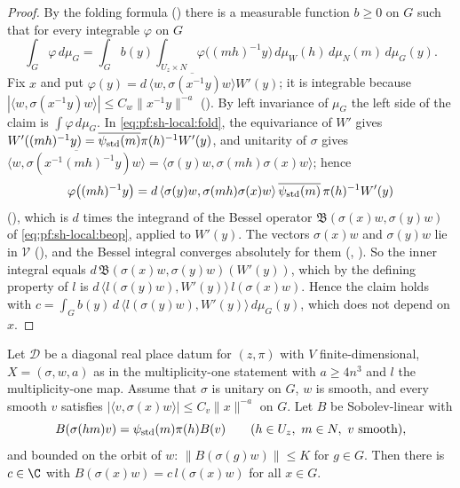 \begin{proof}
By the folding formula () there is a measurable
function $b\ge0$ on $G$ such that for every integrable $\varphi$ on $G$
\begin{equation}\label{eq:pf:sh-local:fold}
\int_G\varphi\,d\mu_G=\int_G b(y)\int_{U_z\times N}\varphi\bigl((mh)^{-1}y\bigr)\,d\mu_W(h)\,d\mu_N(m)\,d\mu_G(y).
\end{equation}
Fix $x$ and put $\varphi(y)=d\,\overline{\langle w,\sigma(x^{-1}y)w\rangle}W'(y)$; it is integrable because
$|\langle w,\sigma(x^{-1}y)w\rangle|\le C_w\|x^{-1}y\|^{-a}$
(). By left invariance of $\mu_G$ the
left side of the claim is $\int\varphi\,d\mu_G$. In \eqref{eq:pf:sh-local:fold}, the equivariance of $W'$ gives
$W'((mh)^{-1}y)=\overline{\psi_{\mathrm{std}}(m)}\pi(h)^{-1}W'(y)$, and unitarity of $\sigma$ gives
$\overline{\langle w,\sigma(x^{-1}(mh)^{-1}y)w\rangle}=\langle\sigma(y)w,\sigma(mh)\sigma(x)w\rangle$; hence
\[
\varphi\bigl((mh)^{-1}y\bigr)=d\,\langle\sigma(y)w,\sigma(mh)\sigma(x)w\rangle\,\overline{\psi_{\mathrm{std}}(m)}\,\pi(h)^{-1}W'(y)
\]
(), which is $d$ times the integrand of the
Bessel operator $\mathfrak B(\sigma(x)w,\sigma(y)w)$ of \eqref{eq:pf:sh-local:beop}, applied to $W'(y)$. The
vectors $\sigma(x)w$ and $\sigma(y)w$ lie in $\mathcal V$
(), and the Bessel integral converges
absolutely for them (,
). So the inner integral equals
$d\,\mathfrak B(\sigma(x)w,\sigma(y)w)(W'(y))$, which by the defining property of $l$ is
$d\,\langle l(\sigma(y)w),W'(y)\rangle\,l(\sigma(x)w)$. Hence the claim holds with
$c=\int_G b(y)\,d\,\langle l(\sigma(y)w),W'(y)\rangle\,d\mu_G(y)$, which does not depend on $x$.
\end{proof}

\begin{proposition}\label{pf:sh-local:orbitmult}
Let $\mathcal D$ be a diagonal real place datum for $(z,\pi)$ with $V$ finite-dimensional, $X=(\sigma,w,a)$ as
in the multiplicity-one statement with $a\ge4n^3$ and $l$ the multiplicity-one map. Assume that $\sigma$ is unitary
on $G$, $w$ is smooth, and every smooth $v$ satisfies $|\langle v,\sigma(x)w\rangle|\le C_v\|x\|^{-a}$ on $G$. Let
$B$ be Sobolev-linear with
\[
B(\sigma(hm)v)=\psi_{\mathrm{std}}(m)\pi(h)B(v)\qquad(h\in U_z,\ m\in N,\ v\text{ smooth}),
\]
and bounded on the orbit of $w$: $\|B(\sigma(g)w)\|\le K$ for $g\in G$. Then there is $c\in\C$ with
$B(\sigma(x)w)=c\,l(\sigma(x)w)$ for all $x\in G$.
\end{proposition}

